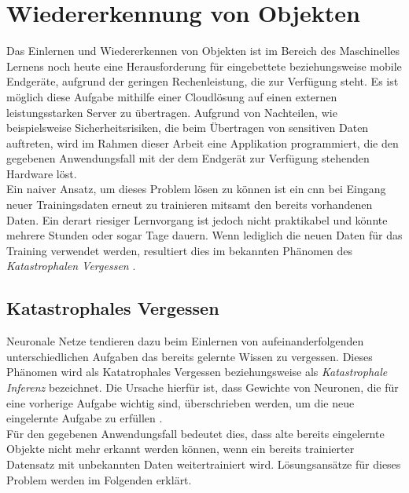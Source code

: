 \documentclass[oneside]{ausarbeitung}
\begin{document}
\section{Wiedererkennung von Objekten}
\label{sec:basics:wiedererkennung}
Das Einlernen und Wiedererkennen von Objekten ist im Bereich des Maschinelles Lernens noch heute eine Herausforderung für eingebettete beziehungsweise mobile Endgeräte, aufgrund der geringen Rechenleistung, die zur Verfügung steht. Es ist möglich diese Aufgabe mithilfe einer Cloudlösung auf einen externen leistungsstarken Server zu übertragen. Aufgrund von Nachteilen, wie beispielsweise Sicherheitsrisiken, die beim Übertragen von sensitiven Daten auftreten, wird im Rahmen dieser Arbeit eine Applikation programmiert, die den gegebenen Anwendungsfall mit der dem Endgerät zur Verfügung stehenden Hardware löst.\\
Ein naiver Ansatz, um dieses Problem lösen zu können ist ein  \ac{cnn} bei Eingang neuer Trainingsdaten erneut zu trainieren mitsamt den bereits vorhandenen Daten. Ein derart riesiger Lernvorgang ist jedoch nicht praktikabel und könnte mehrere Stunden oder sogar Tage dauern. Wenn lediglich die neuen Daten für das Training verwendet werden, resultiert dies im bekannten Phänomen des \textit{Katastrophalen Vergessen} \cite{Senchanka2019}.
\subsection{Katastrophales Vergessen}
Neuronale Netze tendieren dazu beim Einlernen von aufeinanderfolgenden unterschiedlichen Aufgaben das bereits gelernte Wissen zu vergessen. Dieses Phänomen wird als Katatrophales Vergessen beziehungsweise als \textit{Katastrophale Inferenz} bezeichnet. Die Ursache hierfür ist, dass Gewichte von Neuronen, die für eine vorherige Aufgabe wichtig sind, überschrieben werden, um die neue eingelernte Aufgabe zu erfüllen \cite{forgetting}.\\
Für den gegebenen Anwendungsfall bedeutet dies, dass alte bereits eingelernte Objekte nicht mehr erkannt werden können, wenn ein bereits trainierter Datensatz mit unbekannten Daten weitertrainiert wird. Lösungsansätze für dieses Problem werden im Folgenden erklärt.
\end{document}
